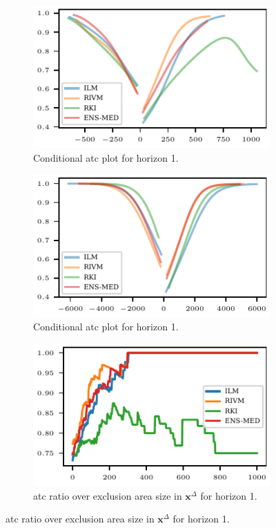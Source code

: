 \documentclass[pdflatex]{sn-jnl}
\theoremstyle{plain}%
\theoremstyle{definition}
\newcommand{\diffx}{\mathbf{x}^{\Delta}}
\begin{document}
\begin{figure}
    \centering
    \begin{subfigure}[t]{.48\textwidth}
    \includegraphics{plots/covid_nowcast/40_cond_prob_lag_1}
    \caption{Conditional \ac{atc} plot for horizon 1.}\label{fig:app-covid-cond-prob-1}
    \end{subfigure}\hfill
    \begin{subfigure}[t]{.48\textwidth}
    \includegraphics{plots/covid_nowcast/40_cond_prob_lag_14}
    \caption{Conditional \ac{atc} plot for horizon 1.}\label{fig:app-covid-cond-prob-14}
    \end{subfigure}
    \begin{subfigure}[t]{.48\textwidth}
    \includegraphics{plots/covid_nowcast/40_acc_eps_lag_1}
    \caption{\Ac{atc} ratio over exclusion area size in $\diffx$ for horizon 1.}\label{fig:app-covid-atc-ratio-1}

\end{subfigure}
\end{figure}
\end{document}
